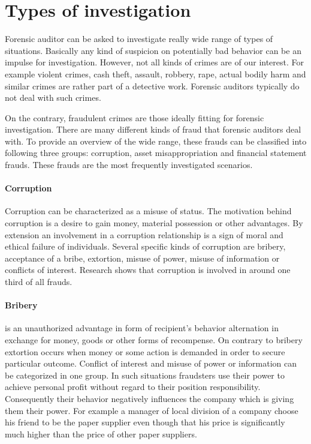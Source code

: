 


\section{Types of investigation}

Forensic auditor can be asked to investigate really wide range of types of situations. Basically any kind of suspicion on potentially bad behavior can be an impulse for investigation. However, not all kinds of crimes are of our interest. For example violent crimes, cash theft, assault, robbery, rape, actual bodily harm and similar crimes are rather part of a detective work. Forensic auditors typically do not deal with such crimes. 

On the contrary, fraudulent crimes are those ideally fitting for forensic investigation. There are many different kinds of fraud that forensic auditors deal with. To provide an overview of the wide range, these frauds can be classified into following three groups: corruption, asset misappropriation and financial statement frauds. These frauds are the most frequently investigated scenarios.

\paragraph {Corruption}
Corruption can be characterized as a misuse of status. The motivation behind corruption is a desire to gain money, material possession or other advantages. By extension an involvement in a corruption relationship is a sign of moral and ethical failure of individuals. Several specific kinds of corruption are bribery, acceptance of a bribe, extortion, misuse of power, misuse of information or conflicts of interest. Research shows that corruption is involved in around one third of all frauds. \cite{weaver}

\paragraph{Bribery} is an unauthorized advantage in form of recipient's behavior alternation in exchange for money, goods or other forms of recompense. On contrary to bribery extortion occurs when money or some action is demanded in order to secure particular outcome. Conflict of interest and misuse of power or information can be categorized in one group. In such situations fraudsters use their power to achieve personal profit without regard to their position responsibility. Consequently their behavior negatively influences the company which is giving them their power. For example a manager of local division of a company choose his friend to be the paper supplier even though that his price is significantly much higher than the price of other paper suppliers.


